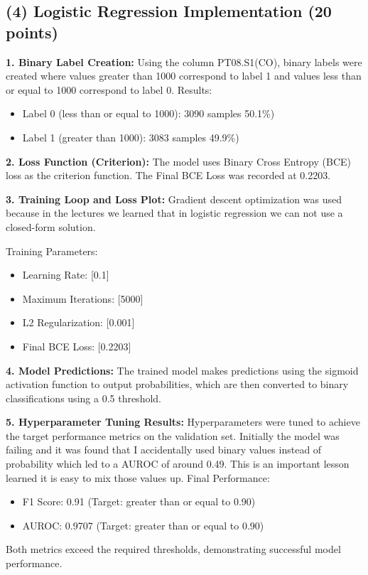 \documentclass{article}
\begin{document}
\subsection*{(4) Logistic Regression Implementation (20 points)}

\textbf{1. Binary Label Creation:}
Using the column PT08.S1(CO), binary labels were created where values greater than 1000 correspond to label 1 and values less than or equal to 1000 correspond to label 0.
\vspace{1cm}
Results:
\begin{itemize}
\item Label 0 (less than or equal to 1000): 3090 samples 50.1\%)
\item Label 1 (greater than 1000): 3083 samples 49.9\%)
\end{itemize}
\vspace{1cm}
\textbf{2. Loss Function (Criterion):}
The model uses Binary Cross Entropy (BCE) loss as the criterion function. The Final BCE Loss was recorded at 0.2203.

\textbf{3. Training Loop and Loss Plot:}
Gradient descent optimization was used because in the lectures we learned that in logistic regression we can not use a closed-form solution. 

Training Parameters:
\begin{itemize}
\item Learning Rate: [0.1]
\item Maximum Iterations: [5000]
\item L2 Regularization: [0.001]
\item Final BCE Loss: [0.2203]
\end{itemize}

\textbf{4. Model Predictions:}
The trained model makes predictions using the sigmoid activation function to output probabilities, which are then converted to binary classifications using a 0.5 threshold.

\textbf{5. Hyperparameter Tuning Results:}
Hyperparameters were tuned to achieve the target performance metrics on the validation set. Initially the model was failing and it was found that I accidentally used binary values instead of probability which led to a AUROC of around 0.49. This is an important lesson learned it is easy to mix those values up. 
\vspace{1cm}
Final Performance:
\begin{itemize}
\item F1 Score: 0.91 (Target: greater than or equal to 0.90)
\item AUROC: 0.9707 (Target: greater than or equal to 0.90)
\end{itemize}
Both metrics exceed the required thresholds, demonstrating successful model performance.
\end{document}
